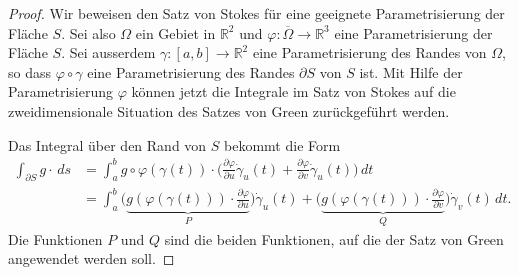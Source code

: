 \begin{proof}
Wir beweisen den Satz von Stokes für eine geeignete Parametrisierung
der Fläche $S$.
Sei also $\Omega$ ein Gebiet in $\mathbb{R}^2$ und 
$\varphi\colon\overline{\Omega}\to\mathbb{R}^3$ eine Parametrisierung
der Fläche $S$.
Sei ausserdem $\gamma\colon[a,b]\to\mathbb{R}^2$ eine Parametrisierung
des Randes von $\Omega$, so dass $\varphi\circ\gamma$ eine Parametrisierung
des Randes $\partial S$ von $S$ ist.
Mit Hilfe der Parametrisierung $\varphi$ können jetzt die Integrale
im Satz von Stokes auf die zweidimensionale Situation des Satzes von
Green zurückgeführt werden.

Das Integral über den Rand von $S$ bekommt die Form
\begin{align*}
\int_{\partial S}g\cdot\,ds
&=
\int_a^b
g\circ\varphi(\gamma(t))
\cdot
\biggl(
\frac{\partial\varphi}{\partial u}
\dot{\gamma}_u(t)
+
\frac{\partial\varphi}{\partial v}
\dot{\gamma}_u(t)
\biggr)
\,dt
\\
&=
\int_a^b
\biggl(
\underbrace{
g(\varphi(\gamma(t)))
\cdot
\frac{\partial\varphi}{\partial u}
}_{\displaystyle P}
\biggr)
\dot{\gamma}_u(t)
+
\biggl(
\underbrace{
g(\varphi(\gamma(t)))
\cdot
\frac{\partial\varphi}{\partial v}
}_{\displaystyle Q}
\biggr)
\dot{\gamma}_v(t)
\,dt
.
\end{align*}
Die Funktionen $P$ und $Q$ sind die beiden Funktionen, auf die
der Satz von Green angewendet werden soll.


\end{proof}
